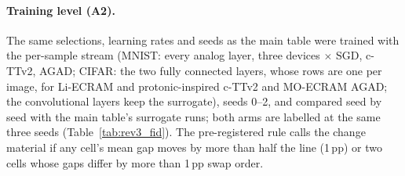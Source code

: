 \paragraph{Training level (A2).} The same selections, learning rates and seeds as the main table were trained with the
per-sample stream (MNIST: every analog layer, three devices $\times$ SGD, c-TTv2, AGAD; CIFAR: the two fully connected layers,
whose rows are one per image, for Li-ECRAM and protonic-inspired c-TTv2 and MO-ECRAM AGAD; the convolutional layers keep the
surrogate), seeds 0--2, and compared seed by seed with the main table's surrogate runs; both arms are labelled at the same three
seeds (Table~\ref{tab:rev3_fid}). The pre-registered rule calls the change material if any cell's mean gap moves by more than
half the line (1\,pp) or two cells whose gaps differ by more than 1\,pp swap order.
